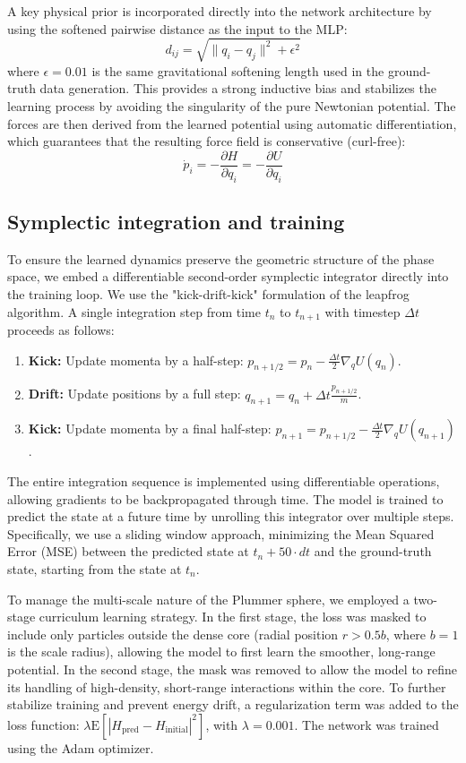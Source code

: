 \documentclass[]{article}
\begin{document}
A key physical prior is incorporated directly into the network architecture by using the softened pairwise distance as the input to the MLP:
\begin{equation}
    d_{ij} = \sqrt{\|q_i - q_j\|^2 + \epsilon^2}
\end{equation}
where $\epsilon=0.01$ is the same gravitational softening length used in the ground-truth data generation. This provides a strong inductive bias and stabilizes the learning process by avoiding the singularity of the pure Newtonian potential. The forces are then derived from the learned potential using automatic differentiation, which guarantees that the resulting force field is conservative (curl-free):
\begin{equation}
    \dot{p}_i = -\frac{\partial H}{\partial q_i} = -\frac{\partial U}{\partial q_i}
\end{equation}

\subsection{Symplectic integration and training}
To ensure the learned dynamics preserve the geometric structure of the phase space, we embed a differentiable second-order symplectic integrator directly into the training loop. We use the "kick-drift-kick" formulation of the leapfrog algorithm. A single integration step from time $t_n$ to $t_{n+1}$ with timestep $\Delta t$ proceeds as follows:
\begin{enumerate}
    \item \textbf{Kick:} Update momenta by a half-step: $p_{n+1/2} = p_n - \frac{\Delta t}{2} \nabla_q U(q_n)$.
    \item \textbf{Drift:} Update positions by a full step: $q_{n+1} = q_n + \Delta t \frac{p_{n+1/2}}{m}$.
    \item \textbf{Kick:} Update momenta by a final half-step: $p_{n+1} = p_{n+1/2} - \frac{\Delta t}{2} \nabla_q U(q_{n+1})$.
\end{enumerate}
The entire integration sequence is implemented using differentiable operations, allowing gradients to be backpropagated through time. The model is trained to predict the state at a future time by unrolling this integrator over multiple steps. Specifically, we use a sliding window approach, minimizing the Mean Squared Error (MSE) between the predicted state at $t_n + 50 \cdot dt$ and the ground-truth state, starting from the state at $t_n$.

To manage the multi-scale nature of the Plummer sphere, we employed a two-stage curriculum learning strategy. In the first stage, the loss was masked to include only particles outside the dense core (radial position $r > 0.5b$, where $b=1$ is the scale radius), allowing the model to first learn the smoother, long-range potential. In the second stage, the mask was removed to allow the model to refine its handling of high-density, short-range interactions within the core. To further stabilize training and prevent energy drift, a regularization term was added to the loss function: $\lambda \mathrm{E}[|H_{\mathrm{pred}} - H_{\mathrm{initial}}|^2]$, with $\lambda = 0.001$. The network was trained using the Adam optimizer.
\end{document}
